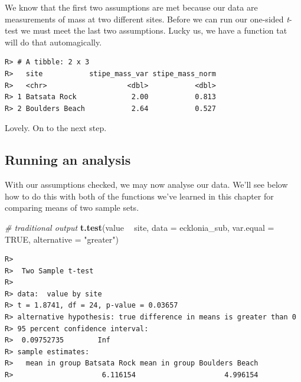 \documentclass[english,10pt,a4paper,oneside]{book}
\newenvironment{Shaded}{\begin{snugshade}}{\end{snugshade}}
\newcommand{\KeywordTok}[1]{\textcolor[rgb]{0.13,0.29,0.53}{\textbf{#1}}}
\newcommand{\DataTypeTok}[1]{\textcolor[rgb]{0.13,0.29,0.53}{#1}}
\newcommand{\DecValTok}[1]{\textcolor[rgb]{0.00,0.00,0.81}{#1}}
\newcommand{\StringTok}[1]{\textcolor[rgb]{0.31,0.60,0.02}{#1}}
\newcommand{\CommentTok}[1]{\textcolor[rgb]{0.56,0.35,0.01}{\textit{#1}}}
\newcommand{\OtherTok}[1]{\textcolor[rgb]{0.56,0.35,0.01}{#1}}
\newcommand{\OperatorTok}[1]{\textcolor[rgb]{0.81,0.36,0.00}{\textbf{#1}}}
\newcommand{\NormalTok}[1]{#1}
\theoremstyle{definition}
\theoremstyle{definition}
\theoremstyle{definition}
\theoremstyle{remark}
\begin{document}
We know that the first two assumptions are met because our data are
measurements of mass at two different sites. Before we can run our
one-sided \emph{t}-test we must meet the last two assumptions. Lucky us,
we have a function tat will do that automagically.

\begin{Shaded}
\end{Shaded}

\begin{verbatim}
R> # A tibble: 2 x 3
R>   site           stipe_mass_var stipe_mass_norm
R>   <chr>                   <dbl>           <dbl>
R> 1 Batsata Rock             2.00           0.813
R> 2 Boulders Beach           2.64           0.527
\end{verbatim}

Lovely. On to the next step.

\subsection{Running an analysis}\label{running-an-analysis}

With our assumptions checked, we may now analyse our data. We'll see
below how to do this with both of the functions we've learned in this
chapter for comparing means of two sample sets.

\begin{Shaded}
\begin{Highlighting}[]
\CommentTok{# traditional output}
\KeywordTok{t.test}\NormalTok{(value }\OperatorTok{~}\StringTok{ }\NormalTok{site, }\DataTypeTok{data =}\NormalTok{ ecklonia_sub, }\DataTypeTok{var.equal =} \OtherTok{TRUE}\NormalTok{, }\DataTypeTok{alternative =} \StringTok{"greater"}\NormalTok{)}
\end{Highlighting}
\end{Shaded}

\begin{verbatim}
R> 
R>  Two Sample t-test
R> 
R> data:  value by site
R> t = 1.8741, df = 24, p-value = 0.03657
R> alternative hypothesis: true difference in means is greater than 0
R> 95 percent confidence interval:
R>  0.09752735        Inf
R> sample estimates:
R>   mean in group Batsata Rock mean in group Boulders Beach 
R>                     6.116154                     4.996154
\end{verbatim}
\end{document}
